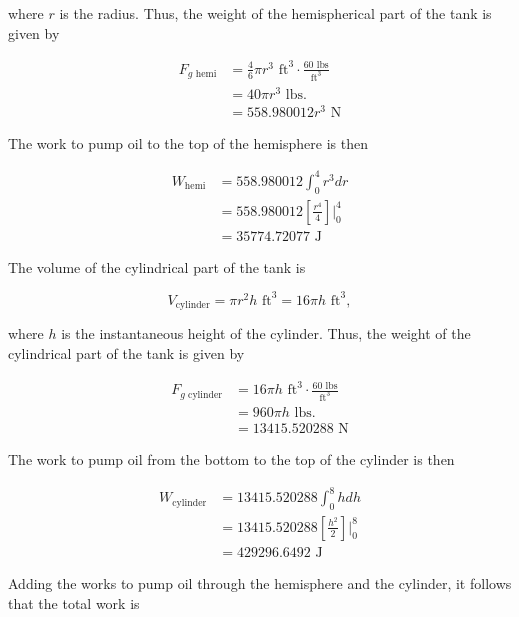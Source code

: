 \documentclass{article}
\begin{document}
    where $r$ is the radius. Thus, the weight of the hemispherical part of the tank is given by

    \begin{align*}
        F_{g{\text{ hemi}}}   &= \frac{4}{6} \pi r^3 \text{ ft}^3 \cdot \frac{60 \text{ lbs}}{\text{ft}^3}  \\
                            &= 40\pi r^3 \text{ lbs.} \\
                            &= 558.980012 r^3 \text{ N}
    \end{align*}

    The work to pump oil to the top of the hemisphere is then

    \begin{align*}
        W_{\text{hemi}} &= 558.980012 \int_0^4 r^3 dr \\
                        &= 558.980012 \left[\frac{r^4}{4}\right]\Big|_0^4 \\
                        &= 35774.72077 \text{ J}
    \end{align*}

    The volume of the cylindrical part of the tank is

    \[
        V_{\text{cylinder}} = \pi r^2 h \text{ ft}^3 = 16\pi h \text{ ft}^3,
    \]

    where $h$ is the instantaneous height of the cylinder. Thus, the weight of the cylindrical part of the tank is given by

    \begin{align*}
        F_{g{\text{ cylinder}}} &= 16\pi h \text{ ft}^3 \cdot \frac{60 \text{ lbs}}{\text{ft}^3} \\
                                &= 960 \pi h \text{ lbs.} \\
                                &= 13415.520288 \text{ N}
    \end{align*}

    The work to pump oil from the bottom to the top of the cylinder is then

    \begin{align*}
        W_{\text{cylinder}} &= 13415.520288 \int_0^8 h dh \\
                            &= 13415.520288 \left[\frac{h^2}{2}\right]\Big|_0^8 \\
                            &= 429296.6492 \text{ J}
    \end{align*}

    Adding the works to pump oil through the hemisphere and the cylinder, it follows that the total work is
\end{document}
